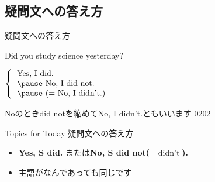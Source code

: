 \documentclass[aspectratio=169,xcolor={dvipsnames,table}]{beamer}
\newcommand{\myaudio}[1]{\href{#1}{\faVolumeUp}}
\begin{document}
\subsection{疑問文への答え方}
 \begin{frame}[plain]{疑問文への答え方}
 \Large
\pause

Did  you study science yesterday?

\vspace{20pt}
\pause

\mbox{}\hspace{100pt}$\left\{\begin{tabular}{l}
         \text{Yes, I did.}\\\pause
         \text{No, I did not.}\\\pause
         \text{(}= \text{No, I didn't.)}
        \end{tabular}\right.$

\pause

\mbox{}\hfill{}{\small Noのときdid notを縮めてNo, I \textcolor{NavyBlue}{didn't}.ともいいます}\,\,{\tiny 0202}\,{\scriptsize \myaudio{./audio/027_past_did_you_03.mp3}}

\pause
\begin{block}{Topics for Today}
\small
疑問文への答え方
\begin{itemize}[square]
 \item  \textcolor{NavyBlue}{\bfseries Yes, S did.} または\textcolor{NavyBlue}{\bfseries No, S did not($=\text{didn't}$).}
 \item  主語がなんであっても同じです
\end{itemize}
      \end{block}

\end{frame}
\end{document}
